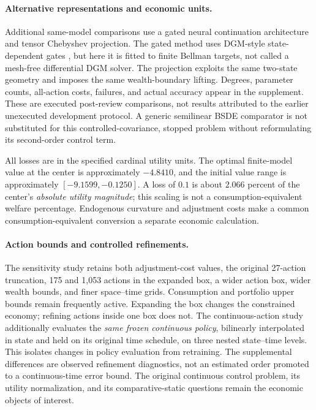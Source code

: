 \documentclass[ecta,nameyear,draft]{econsocart}
\theoremstyle{definition}
\theoremstyle{remark}
\begin{document}
\paragraph*{Alternative representations and economic units.}
Additional same-model comparisons use a gated neural continuation architecture and tensor Chebyshev projection. The gated method uses DGM-style state-dependent gates \citep{sirignano2018}, but here it is fitted to finite Bellman targets, not called a mesh-free differential DGM solver. The projection exploits the same two-state geometry and imposes the same wealth-boundary lifting. Degrees, parameter counts, all-action costs, failures, and actual accuracy appear in the supplement. These are executed post-review comparisons, not results attributed to the earlier unexecuted development protocol. A generic semilinear BSDE comparator is not substituted for this controlled-covariance, stopped problem without reformulating its second-order control term.

All losses are in the specified cardinal utility units. The optimal finite-model value at the center is approximately $-4.8410$, and the initial value range is approximately $[-9.1599,-0.1250]$. A loss of $0.1$ is about $2.066$ percent of the center's \emph{absolute utility magnitude}; this scaling is not a consumption-equivalent welfare percentage. Endogenous curvature and adjustment costs make a common consumption-equivalent conversion a separate economic calculation.

\paragraph*{Action bounds and controlled refinements.}
The sensitivity study retains both adjustment-cost values, the original 27-action truncation, 175 and 1,053 actions in the expanded box, a wider action box, wider wealth bounds, and finer space--time grids. Consumption and portfolio upper bounds remain frequently active. Expanding the box changes the constrained economy; refining actions inside one box does not. The continuous-action study additionally evaluates the \emph{same frozen continuous policy}, bilinearly interpolated in state and held on its original time schedule, on three nested state--time levels. This isolates changes in policy evaluation from retraining. The supplemental differences are observed refinement diagnostics, not an estimated order promoted to a continuous-time error bound. The original continuous control problem, its utility normalization, and its comparative-static questions remain the economic objects of interest.
\end{document}
